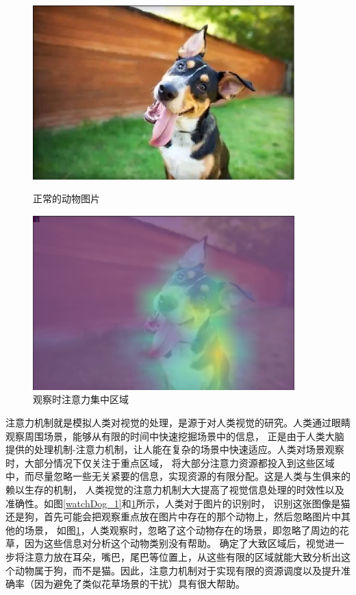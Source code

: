 \begin{figure}[htb]
    \begin{minipage}[t]{0.5\linewidth}
    \centering
    \includegraphics[width=0.9\textwidth]{pic/11.png}
    \caption{正常的动物图片}
    \label{watchDog_1}
    \end{minipage}
    \quad
    \begin{minipage}[t]{0.5\linewidth}
    \centering
    \includegraphics[width=0.9\textwidth]{pic/22.png}
    \caption{观察时注意力集中区域}
    \label{watchDog_2}
    \end{minipage}
\end{figure}


注意力机制就是模拟人类对视觉的处理，是源于对人类视觉的研究。人类通过眼睛观察周围场景，能够从有限的时间中快速挖掘场景中的信息，
正是由于人类大脑提供的处理机制-注意力机制，让人能在复杂的场景中快速适应。人类对场景观察时，大部分情况下仅关注于重点区域，
将大部分注意力资源都投入到这些区域中，而尽量忽略一些无关紧要的信息，实现资源的有限分配。这是人类与生俱来的赖以生存的机制，
人类视觉的注意力机制大大提高了视觉信息处理的时效性以及准确性。如图\ref{watchDog_1}和\ref{watchDog_2}所示，人类对于图片的识别时，
识别这张图像是猫还是狗，首先可能会把观察重点放在图片中存在的那个动物上，然后忽略图片中其他的场景，
如图\ref{watchDog_2}，人类观察时，忽略了这个动物存在的场景，即忽略了周边的花草，因为这些信息对分析这个动物类别没有帮助。
确定了大致区域后，视觉进一步将注意力放在耳朵，嘴巴，尾巴等位置上，从这些有限的区域就能大致分析出这个动物属于狗，而不是猫。因此，注意力机制对于实现有限的资源调度以及提升准确率（因为避免了类似花草场景的干扰）具有很大帮助。

